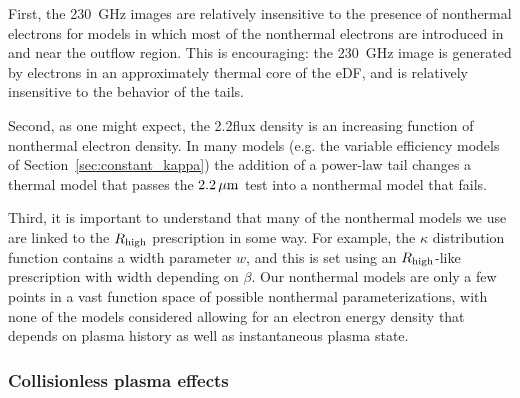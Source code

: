 First, the 230~GHz images are relatively insensitive to the presence of nonthermal electrons for models in which most of the nonthermal electrons are introduced in and near the outflow region.
This is encouraging: the 230~GHz image is generated by electrons in an approximately thermal core of the eDF, and is relatively insensitive to the behavior of the tails.

Second, as one might expect, the 2.2\um flux density is an increasing function of nonthermal electron density.
In many models (e.g. the variable efficiency models of Section~\ref{sec:constant_kappa}) the addition of a power-law tail changes a thermal model that passes the $2.2\,\mu\mathrm{m}$ test into a nonthermal model that fails.

Third, it is important to understand that many of the nonthermal models we use are linked to the $R_\mathrm{high}$ prescription in some way.
For example, the $\kappa$ distribution function contains a width parameter $w$, and this is set using an $R_\mathrm{high}$-like prescription with width depending on $\beta$.
Our nonthermal models are only a few points in a vast function space of possible nonthermal parameterizations, with none of the models considered allowing for an electron energy density that depends on plasma history as well as instantaneous plasma state.

\subsubsection{Collisionless plasma effects}

